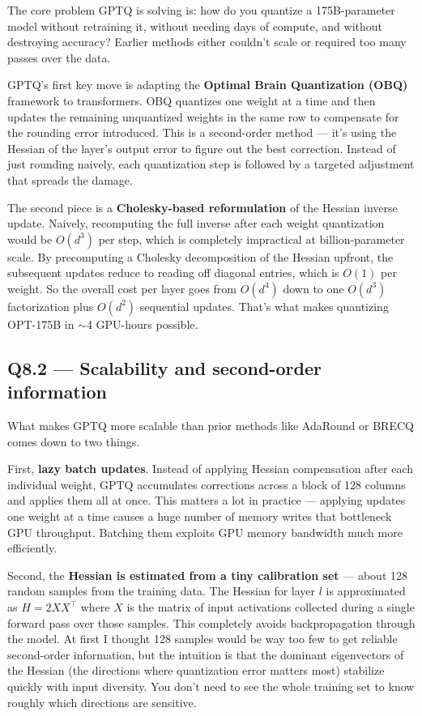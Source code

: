 \documentclass[11pt]{article}
\begin{document}
The core problem GPTQ is solving is: how do you quantize a 175B-parameter model without retraining it, without needing days of compute, and without destroying accuracy? Earlier methods either couldn't scale or required too many passes over the data.

GPTQ's first key move is adapting the \textbf{Optimal Brain Quantization (OBQ)} framework to transformers. OBQ quantizes one weight at a time and then updates the remaining unquantized weights in the same row to compensate for the rounding error introduced. This is a second-order method --- it's using the Hessian of the layer's output error to figure out the best correction. Instead of just rounding naively, each quantization step is followed by a targeted adjustment that spreads the damage.

The second piece is a \textbf{Cholesky-based reformulation} of the Hessian inverse update. Naively, recomputing the full inverse after each weight quantization would be $O(d^3)$ per step, which is completely impractical at billion-parameter scale. By precomputing a Cholesky decomposition of the Hessian upfront, the subsequent updates reduce to reading off diagonal entries, which is $O(1)$ per weight. So the overall cost per layer goes from $O(d^4)$ down to one $O(d^3)$ factorization plus $O(d^2)$ sequential updates. That's what makes quantizing OPT-175B in $\sim$4 GPU-hours possible.

\subsection{Q8.2 --- Scalability and second-order information}

What makes GPTQ more scalable than prior methods like AdaRound or BRECQ comes down to two things.

First, \textbf{lazy batch updates}. Instead of applying Hessian compensation after each individual weight, GPTQ accumulates corrections across a block of 128 columns and applies them all at once. This matters a lot in practice --- applying updates one weight at a time causes a huge number of memory writes that bottleneck GPU throughput. Batching them exploits GPU memory bandwidth much more efficiently.

Second, the \textbf{Hessian is estimated from a tiny calibration set} --- about 128 random samples from the training data. The Hessian for layer $l$ is approximated as $H = 2 X X^\top$ where $X$ is the matrix of input activations collected during a single forward pass over those samples. This completely avoids backpropagation through the model. At first I thought 128 samples would be way too few to get reliable second-order information, but the intuition is that the dominant eigenvectors of the Hessian (the directions where quantization error matters most) stabilize quickly with input diversity. You don't need to see the whole training set to know roughly which directions are sensitive.
\end{document}
